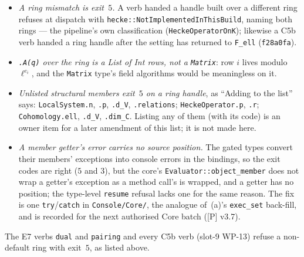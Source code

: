 \documentclass[11pt]{article}
\theoremstyle{remark}
\begin{document}
\begin{itemize}
\item \emph{A ring mismatch is exit~$5$.} A verb handed a handle built over a different ring
  refuses at dispatch with \texttt{hecke::NotImplementedInThisBuild}, naming both rings --- the
  pipeline's own classification (\texttt{HeckeOperatorOnK}); likewise a C5b verb handed a ring
  handle after the setting has returned to \texttt{F\_ell} (\texttt{f28a0fa}).
\item \emph{\texttt{.A(q)} over the ring is a List of Int rows, not a \texttt{Matrix}}: row $i$
  lives modulo $\ell^{e_i}$, and the \texttt{Matrix} type's field algorithms would be meaningless
  on it.
\item \emph{Unlisted structural members exit~$5$ on a ring handle}, as ``Adding to the list''
  says: \texttt{LocalSystem.n}, \texttt{.p}, \texttt{.d\_V}, \texttt{.relations};
  \texttt{HeckeOperator.p}, \texttt{.r}; \texttt{Cohomology.ell}, \texttt{.d\_V},
  \texttt{.dim\_C}. Listing any of them (with its code) is an owner item for a later amendment of
  this list; it is not made here.
\item \emph{A member getter's error carries no source position.} The gated types convert their
  members' exceptions into console errors in the bindings, so the exit codes are right ($5$ and
  $3$), but the core's \texttt{Evaluator::object\_member} does not wrap a getter's exception as a
  method call's is wrapped, and a getter has no position; the type-level \texttt{resume} refusal
  lacks one for the same reason. The fix is one \texttt{try}/\texttt{catch} in
  \texttt{Console/Core/}, the analogue of~(a)'s \texttt{exec\_set} back-fill, and is recorded for
  the next authorised Core batch ([P] v3.7).
\end{itemize}
The E7 verbs \texttt{dual} and \texttt{pairing} and every C5b verb (slot-9 WP-13) refuse a
non-default ring with exit~$5$, as listed above.\par
\end{document}
